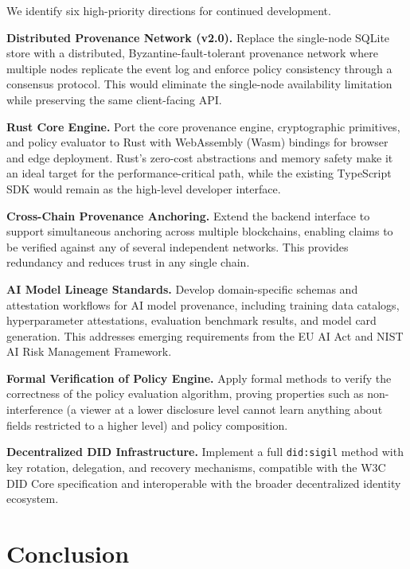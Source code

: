 \documentclass[conference]{IEEEtran}
\begin{document}
We identify six high-priority directions for continued development.

\textbf{Distributed Provenance Network (v2.0).}  Replace the single-node
SQLite store with a distributed, Byzantine-fault-tolerant provenance network
where multiple nodes replicate the event log and enforce policy consistency
through a consensus protocol.  This would eliminate the single-node
availability limitation while preserving the same client-facing API.

\textbf{Rust Core Engine.}  Port the core provenance engine, cryptographic
primitives, and policy evaluator to Rust with WebAssembly (Wasm) bindings for
browser and edge deployment.  Rust's zero-cost abstractions and memory safety
make it an ideal target for the performance-critical path, while the existing
TypeScript SDK would remain as the high-level developer interface.

\textbf{Cross-Chain Provenance Anchoring.}  Extend the backend interface to
support simultaneous anchoring across multiple blockchains, enabling claims to
be verified against any of several independent networks.  This provides
redundancy and reduces trust in any single chain.

\textbf{AI Model Lineage Standards.}  Develop domain-specific schemas and
attestation workflows for AI model provenance, including training data
catalogs, hyperparameter attestations, evaluation benchmark results, and model
card generation.  This addresses emerging requirements from the EU AI Act and
NIST AI Risk Management Framework.

\textbf{Formal Verification of Policy Engine.}  Apply formal methods to verify
the correctness of the policy evaluation algorithm, proving properties such as
non-interference (a viewer at a lower disclosure level cannot learn anything
about fields restricted to a higher level) and policy composition.

\textbf{Decentralized DID Infrastructure.}  Implement a full
\texttt{did:sigil} method with key rotation, delegation, and recovery
mechanisms, compatible with the W3C DID Core specification and interoperable
with the broader decentralized identity ecosystem.


\section{Conclusion}
\end{document}
